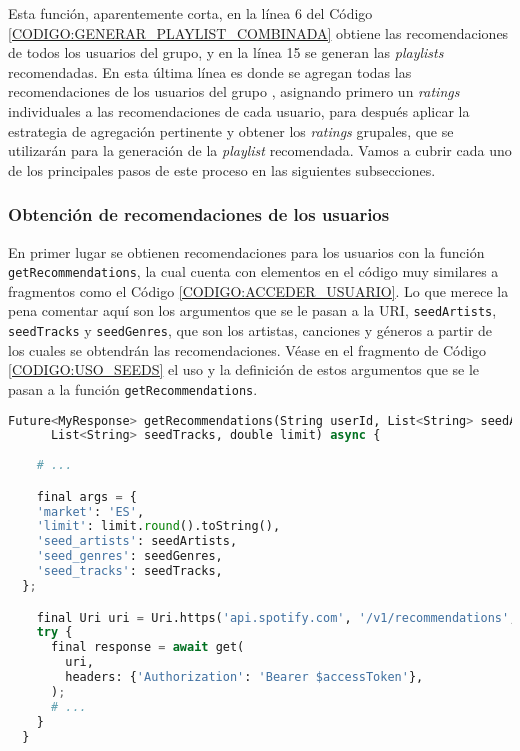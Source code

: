 Esta función, aparentemente corta, en la línea 6 del Código \ref{CODIGO:GENERAR_PLAYLIST_COMBINADA} obtiene las recomendaciones de todos los usuarios del grupo, y en la línea 15 se 
generan las \textit{playlists} recomendadas. En esta última línea es donde se agregan todas las recomendaciones de los usuarios del grupo
, asignando primero un \textit{ratings} individuales a las recomendaciones de cada usuario, para después aplicar la estrategia de agregación pertinente y obtener
los \textit{ratings} grupales, que se utilizarán para la generación de la \textit{playlist} recomendada. Vamos a cubrir cada uno de los principales
pasos de este proceso en las siguientes subsecciones.


\subsubsection{Obtención de recomendaciones de los usuarios\label{subsec:obtencion_recomendaciones_implementacion}}

En primer lugar se obtienen recomendaciones para los usuarios con la función \texttt{getRecommendations}, la cual cuenta con 
elementos en el código muy similares a fragmentos como el Código \ref{CODIGO:ACCEDER_USUARIO}. Lo que merece la pena comentar aquí 
son los argumentos que se le pasan a la URI, \texttt{seedArtists}, \texttt{seedTracks} y \texttt{seedGenres}, que son los artistas, canciones y 
géneros a partir de los cuales se obtendrán las recomendaciones. Véase en el fragmento de Código \ref{CODIGO:USO_SEEDS} el uso y la definición de estos 
argumentos que se le pasan a la función \texttt{getRecommendations}.

\begin{lstlisting}[language=python, caption=Definición de los argumentos \texttt{seedArtists} y \texttt{seedTracks}, label=CODIGO:USO_SEEDS]
  Future<MyResponse> getRecommendations(String userId, List<String> seedArtists,
      List<String> seedTracks, double limit) async {
    
    # ...

    final args = {
    'market': 'ES',
    'limit': limit.round().toString(),
    'seed_artists': seedArtists,
    'seed_genres': seedGenres,
    'seed_tracks': seedTracks,
  };

    final Uri uri = Uri.https('api.spotify.com', '/v1/recommendations', args);
    try {
      final response = await get(
        uri,
        headers: {'Authorization': 'Bearer $accessToken'},
      );
      # ...
    }
  }
\end{lstlisting}

